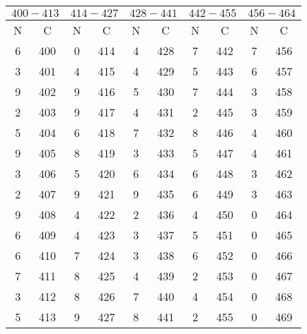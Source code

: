  \begin{table}
    \centering
    \caption{} 
    \label{}
    \label{3}
    \begin{tabular}{c c || c c || c c || c c || c c}
        \midrule
        \multicolumn{2}{c}{$400-413$} & \multicolumn{2}{c}{$414-427$} & \multicolumn{2}{c}{$428-441$} & \multicolumn{2}{c}{$442-455$} & \multicolumn{2}{c}{$456-464$} \\
        \midrule
        N & C & N & C & N & C & N & C & N & C \\
        \midrule
6    &   400 & 0    &   414 & 4     &  428 &7      & 442  & 7    &   456    \\
3    &   401 & 4    &   415 & 4     &  429 &5      & 443  & 6    &   457    \\
9    &   402 & 9    &   416 & 5     &  430 &7      & 444  & 3    &   458    \\
2    &   403 & 9    &   417 & 4     &  431 &2      & 445  & 3    &   459    \\
5    &   404 & 6    &   418 & 7     &  432 &8      & 446  & 4    &   460    \\
9    &   405 & 8    &   419 & 3     &  433 &5      & 447  & 4    &   461    \\
3    &   406 & 5    &   420 & 6     &  434 &6      & 448  & 3    &   462    \\
2    &   407 & 9    &   421 & 9     &  435 &6      & 449  & 3    &   463    \\
9    &   408 & 4    &   422 & 2     &  436 &4      & 450  & 0    &   464    \\
6    &   409 & 4    &   423 & 3     &  437 &5      & 451  & 0    &   465    \\
6    &   410 & 7    &   424 & 3     &  438 &6      & 452  & 0    &   466    \\
7    &   411 & 8    &   425 & 4     &  439 &2      & 453  & 0    &   467    \\
3    &   412 & 8    &   426 & 7     &  440 &4      & 454  & 0    &   468    \\
5    &   413 & 9    &   427 & 8     &  441 &2      & 455  & 0    &   469    \\
    \end{tabular}
\end{table}